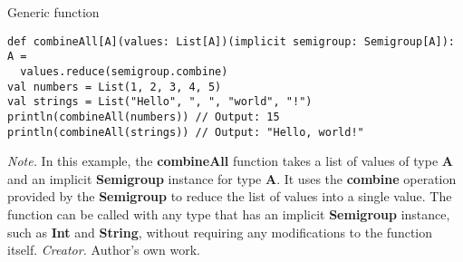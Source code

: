 \begin{table}[h!]
\caption{Generic function}
\begin{lstlisting}
def combineAll[A](values: List[A])(implicit semigroup: Semigroup[A]): A =
  values.reduce(semigroup.combine)
val numbers = List(1, 2, 3, 4, 5)
val strings = List("Hello", ", ", "world", "!")
println(combineAll(numbers)) // Output: 15
println(combineAll(strings)) // Output: "Hello, world!"
\end{lstlisting}
\small
\textit{Note.} In this example, the \textbf{combineAll} function takes a list of values of type \textbf{A} and an implicit \textbf{Semigroup} instance for type \textbf{A}. It uses the \textbf{combine} operation provided by the \textbf{Semigroup} to reduce the list of values into a single value. The function can be called with any type that has an implicit \textbf{Semigroup} instance, such as \textbf{Int} and \textbf{String}, without requiring any modifications to the function itself.
\textit{Creator.} Author's own work.
\end{table}